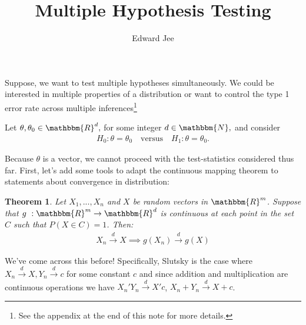 \documentclass{article}
\author{Edward Jee}
\title{Multiple Hypothesis Testing}
\newtheorem{theorem}{Theorem}
\begin{document}
\maketitle


\section*{}
Suppose, we want to test multiple hypotheses simultaneously. We could be 
interested in multiple properties of a distribution or want to control the 
type 1 error rate across multiple inferences\footnote{See the appendix at the 
end of this note for more details.}

    
Let $\theta, \theta_0 \in \mathbbm{R}^d, $ for some integer $d \in \mathbbm{N},$ and consider\begin{align}
        H_0: \theta = \theta_0\quad \text{versus} \quad H_1: \theta = \theta_0.
\end{align}
    
    Because $\theta$ is a vector, we cannot proceed with the test-statistics considered thus far. 
    First, let's add some tools to adapt the continuous mapping theorem to 
    statements about convergence in distribution:
    
    \begin{theorem}\label{cmt-d}
        Let $X_1, ..., X_n$ and $X$ be random vectors in $\mathbbm{R}^m$. Suppose 
        that $g \ : \mathbbm{R}^m \rightarrow \mathbbm{R}^d$ is continuous at 
        each point in the set $C$ such that $P(X \in C) = 1$. Then:
        \begin{align*}
            X_n \xrightarrow{d} X \implies g(X_n) \xrightarrow{d} g(X)
        \end{align*}
    \end{theorem}


    We've come across this before! Specifically, Slutsky is the case where 
    $X_n \xrightarrow{d} X, Y_n \xrightarrow{d} c$ for some constant $c$ and
     since addition and 
    multiplication are continuous operations we have $X_n' Y_n \xrightarrow{d} X'c$, 
    $X_n + Y_n \xrightarrow{d} X + c$. 
\end{document}
